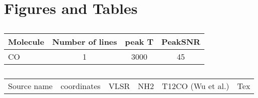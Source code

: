\section{Figures and Tables}
\begin{table}
\caption{}
\begin{tabular}{ l c c c }
Molecule & Number of lines & peak T & PeakSNR\\
\hline
CO       & 1               & 3000   & 45      \\
\hline
\end{tabular}
\end{table}


\begin{table}
\caption{}
\begin{tabular}{ l c c c c c}
Source name & coordinates & VLSR & NH2 & T12CO (Wu et al.)& Tex \\
\end{tabular}
\end{table}
 
  
  
  
  
  
  
  
  
  
  
  
  
  
  
  
  
  
  
  
  
  